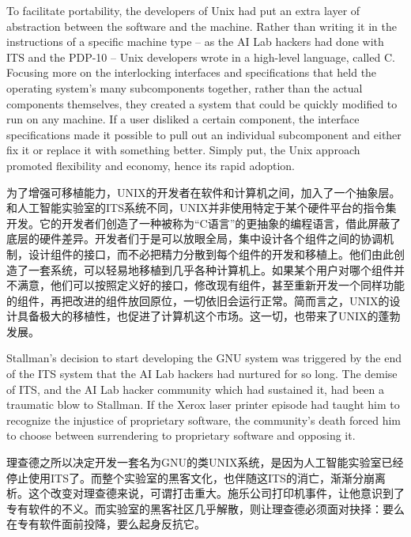 \ifdefined\eng
To facilitate portability, the developers of Unix had put an extra layer of abstraction between the software and the machine. Rather than writing it in the instructions of a specific machine type -- as the AI Lab hackers had done with ITS and the PDP-10 -- Unix developers wrote in a high-level language, called C. Focusing more on the interlocking interfaces and specifications that held the operating system's many subcomponents together, rather than the actual components themselves, they created a system that could be quickly modified to run on any machine. If a user disliked a certain component, the interface specifications made it possible to pull out an individual subcomponent and either fix it or replace it with something better. Simply put, the Unix approach promoted flexibility and economy, hence its rapid adoption.
\fi

\ifdefined\chs
为了增强可移植能力，UNIX的开发者在软件和计算机之间，加入了一个抽象层。和人工智能实验室的ITS系统不同，UNIX并非使用特定于某个硬件平台的指令集开发。它的开发者们创造了一种被称为``C语言''的更抽象的编程语言，借此屏蔽了底层的硬件差异。开发者们于是可以放眼全局，集中设计各个组件之间的协调机制，设计组件的接口，而不必把精力分散到每个组件的开发和移植上。他们由此创造了一套系统，可以轻易地移植到几乎各种计算机上。如果某个用户对哪个组件并不满意，他们可以按照定义好的接口，修改现有组件，甚至重新开发一个同样功能的组件，再把改进的组件放回原位，一切依旧会运行正常。简而言之，UNIX的设计具备极大的移植性，也促进了计算机这个市场。这一切，也带来了UNIX的蓬勃发展。
\fi

\ifdefined\eng
Stallman's decision to start developing the GNU system was triggered by the end of the ITS system that the AI Lab hackers had nurtured for so long. The demise of ITS, and the AI Lab hacker community which had sustained it, had been a traumatic blow to Stallman. If the Xerox laser printer episode had taught him to recognize the injustice of proprietary software, the community's death forced him to choose between surrendering to proprietary software and opposing it.
\fi

\ifdefined\chs
理查德之所以决定开发一套名为GNU的类UNIX系统，是因为人工智能实验室已经停止使用ITS了。而整个实验室的黑客文化，也伴随这ITS的消亡，渐渐分崩离析。这个改变对理查德来说，可谓打击重大。施乐公司打印机事件，让他意识到了专有软件的不义。而实验室的黑客社区几乎解散，则让理查德必须面对抉择：要么在专有软件面前投降，要么起身反抗它。
\fi

